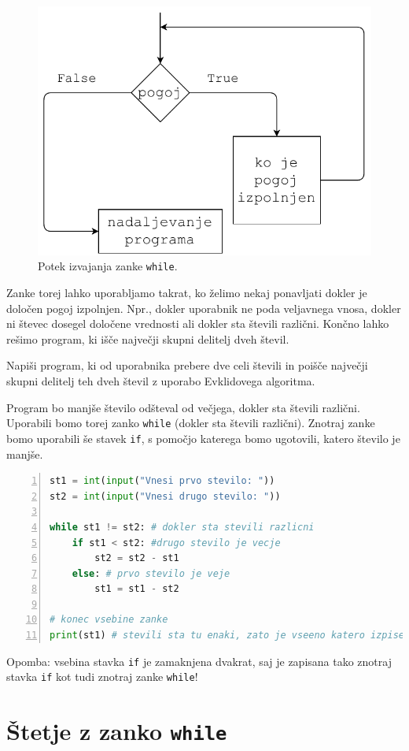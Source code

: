 \begin{figure}
    \centering
    \includegraphics[width=0.5\linewidth]{img/while1.pdf}
    \caption{Potek izvajanja zanke \texttt{while}.}
    \label{img:while1}
\end{figure}

Zanke torej lahko uporabljamo takrat, ko želimo nekaj ponavljati dokler je določen pogoj izpolnjen. Npr., dokler uporabnik ne poda veljavnega vnosa, dokler ni števec dosegel določene vrednosti ali dokler sta števili različni. Končno lahko rešimo program, ki išče največji skupni delitelj dveh števil.
\begin{zgled}
Napiši program, ki od uporabnika prebere dve celi števili in poišče največji skupni delitelj teh dveh števil z uporabo Evklidovega algoritma.
\end{zgled}
\begin{resitev}
Program bo manjše število odšteval od večjega, dokler sta števili različni. Uporabili bomo torej zanko \texttt{while} (dokler sta števili različni).  Znotraj zanke bomo uporabili še stavek \texttt{if}, s pomočjo katerega bomo ugotovili, katero število je manjše. 
\begin{lstlisting}[language=Python,numbers=left]
st1 = int(input("Vnesi prvo stevilo: "))
st2 = int(input("Vnesi drugo stevilo: "))

while st1 != st2: # dokler sta stevili razlicni
    if st1 < st2: #drugo stevilo je vecje
        st2 = st2 - st1
    else: # prvo stevilo je veje
        st1 = st1 - st2

# konec vsebine zanke 
print(st1) # stevili sta tu enaki, zato je vseeno katero izpisem
\end{lstlisting}
Opomba: vsebina stavka \texttt{if} je zamaknjena dvakrat, saj je zapisana tako znotraj stavka \texttt{if} kot tudi znotraj zanke \texttt{while}!
\end{resitev}

\section{Štetje z zanko \texttt{while}}

